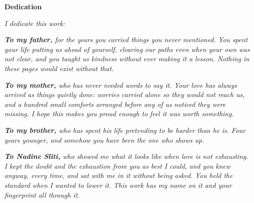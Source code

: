 
\thispagestyle{empty}

\begingroup
\centering
{}

\vspace*{0.2cm}

{\Large\bfseries Dedication\par}

\vspace{0.8cm}

\textit{I dedicate this work:}

\vspace{0.45cm}

\textit{\textbf{To my father,} for the years you carried things you never mentioned. You
spent your life putting us ahead of yourself, clearing our paths even when your own was not
clear, and you taught us kindness without ever making it a lesson. Nothing in these pages
would exist without that.}

\vspace{0.4cm}

\textit{\textbf{To my mother,} who has never needed words to say it. Your love has always
arrived as things quietly done: worries carried alone so they would not reach us, and a
hundred small comforts arranged before any of us noticed they were missing. I hope this
makes you proud enough to feel it was worth something.}

\vspace{0.4cm}

\textit{\textbf{To my brother,} who has spent his life pretending to be harder than he is.
Four years younger, and somehow you have been the one who shows up.}

\vspace{0.4cm}

\textit{\textbf{To Nadine Sliti,} who showed me what it looks like when love is not
exhausting. I kept the doubt and the exhaustion from you as best I could, and you knew
anyway, every time, and sat with me in it without being asked. You held the standard when I
wanted to lower it. This work has my name on it and your fingerprint all through it.}

\vspace{0.4cm}

